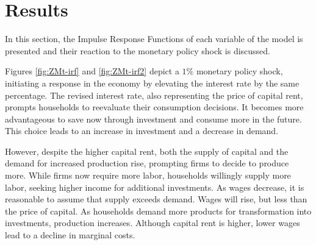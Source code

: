 \documentclass[../thesis.tex]{subfiles}
\begin{document}
	\newpage

	\section{Results}\label{sec:results}	

	In this section, the Impulse Response Functions of each variable of the model is presented and their reaction to the monetary policy shock is discussed.
	
	
	Figures \eqref{fig:ZMt-irf} and \eqref{fig:ZMt-irf2} depict a $1\%$ monetary policy shock, initiating a response in the economy by elevating the interest rate by the same percentage. The revised interest rate, also representing the price of capital rent, prompts households to reevaluate their consumption decisions. It becomes more advantageous to save now through investment and consume more in the future. This choice leads to an increase in investment and a decrease in demand.
	
	However, despite the higher capital rent, both the supply of capital and the demand for increased production rise, prompting firms to decide to produce more. While firms now require more labor, households willingly supply more labor, seeking higher income for additional investments. As wages decrease, it is reasonable to assume that supply exceeds demand. Wages will rise, but less than the price of capital. As households demand more products for transformation into investments, production increases. Although capital rent is higher, lower wages lead to a decline in marginal costs.
	
\end{document}
